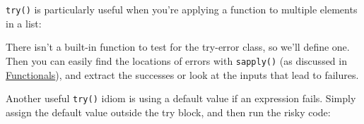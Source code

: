 \texttt{try()} is particularly useful when you're applying a function to
multiple elements in a list:

\begin{Shaded}
\begin{Highlighting}[]
\StringTok{ }\NormalTok{(}\NormalTok{:}\NormalTok{, }\NormalTok{(-}\NormalTok{, }\NormalTok{), }
\StringTok{ }
\StringTok{ }\NormalTok{(}
\end{Highlighting}
\end{Shaded}

There isn't a built-in function to test for the try-error class, so
we'll define one. Then you can easily find the locations of errors with
\texttt{sapply()} (as discussed in \hyperref[functionals]{Functionals}),
and extract the successes or look at the inputs that lead to failures.

\begin{Shaded}
\begin{Highlighting}[]
\StringTok{ }\NormalTok{)}
\StringTok{ }\NormalTok{!}


\end{Highlighting}
\end{Shaded}

Another useful \texttt{try()} idiom is using a default value if an
expression fails. Simply assign the default value outside the try block,
and then run the risky code:

